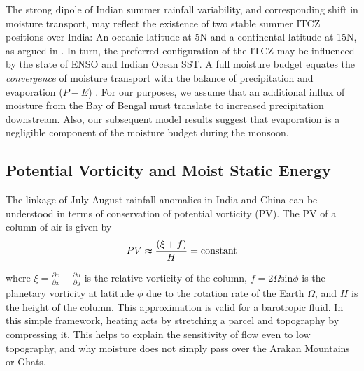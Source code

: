 	The strong dipole of Indian summer rainfall variability, and corresponding shift in moisture transport, may reflect the existence of two stable summer ITCZ positions over India: An oceanic latitude at 5\textdegree N and a continental latitude at 15\textdegree N, as argued in \cite{Gadgil2003}. In turn, the preferred configuration of the ITCZ may be influenced by the state of ENSO and Indian Ocean SST. A full moisture budget equates the \textit{convergence} of moisture transport with the balance of precipitation and evaporation ($P-E$) \citep{Trenberth1991,Chen2014}. For our purposes, we assume that an additional influx of moisture from the Bay of Bengal must translate to increased precipitation downstream. Also, our subsequent model results suggest that evaporation is a negligible component of the moisture budget during the monsoon.
		
\subsection{Potential Vorticity and Moist Static Energy}

	The linkage of July-August rainfall anomalies in India and China can be understood in terms of conservation of potential vorticity (PV). The PV of a column of air is given by
	\begin{displaymath}
			PV  \thickapprox \frac{\left(\xi+f\right)}{H}  = \mathrm{ constant}
	\end{displaymath}
	
	where $\xi = \frac{\partial v}{\partial x}-\frac{\partial u}{\partial y}$ is the relative vorticity of the column, $f=2\Omega\mathrm{sin}\phi$ is the planetary vorticity at latitude $\phi$ due to the rotation rate of the Earth $\Omega$, and $H$ is the height of the column. This approximation is valid for a barotropic fluid. In this simple framework, heating acts by stretching a parcel and topography by compressing it. This helps to explain the sensitivity of flow even to low topography, and why moisture does not simply pass over the Arakan Mountains or Ghats.
	
